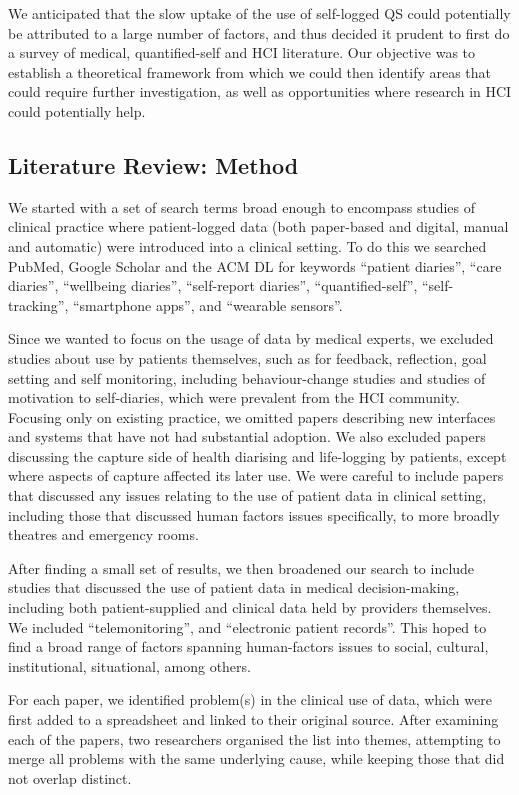 \documentclass{sigchi}
\begin{document}
We anticipated that the slow uptake of the use of self-logged QS could potentially be attributed to a large number of factors, and thus decided it prudent to first do a survey of medical, quantified-self and HCI literature.  Our objective  was to establish a theoretical framework from which we could then identify areas that could require further investigation, as well as opportunities where research in HCI could potentially help.  

\subsection{Literature Review: Method}

We started with a set of search terms broad enough to encompass studies of clinical practice where patient-logged data (both paper-based and digital, manual and automatic) were introduced into a clinical setting.  To do this we searched PubMed, Google Scholar and the ACM DL for keywords ``patient diaries'', ``care diaries'', ``wellbeing diaries'', ``self-report diaries'', ``quantified-self'', ``self-tracking'', ``smartphone apps'', and ``wearable sensors''.

Since we wanted to focus on the usage of data by medical experts, we excluded studies about use by patients themselves, such as for feedback, reflection, goal setting and self monitoring, including behaviour-change studies and studies of motivation to self-diaries, which were prevalent from the HCI community.   Focusing only on existing practice, we omitted papers describing new interfaces and systems that have not had substantial adoption.  We also excluded papers discussing the capture side of health diarising and life-logging by patients, except where aspects of capture affected its later use.  We were careful to include papers that discussed any issues relating to the use of patient data in clinical setting, including those that discussed human factors issues specifically, to more broadly  theatres and emergency rooms.

After finding a small set of results, we then broadened our search to include studies that discussed the use of patient data in medical decision-making, including both patient-supplied and clinical data held by providers themselves.  We included ``telemonitoring'', and ``electronic patient records''.  This  hoped to find a broad range of factors spanning human-factors issues to social, cultural, institutional, situational, among others.

For each paper, we identified problem(s) in the clinical use of data, which were first added to a spreadsheet and linked to their original source.  After examining each of the papers, two researchers organised the list into themes, attempting to merge all problems with the same underlying cause, while keeping those that did not overlap distinct.  %
\end{document}
